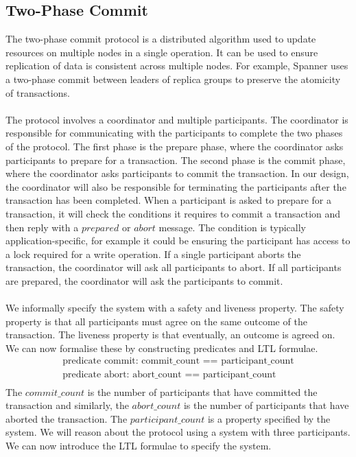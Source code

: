\subsection{Two-Phase Commit} \label{sec:2pc}
The two-phase commit protocol is a distributed algorithm used to update resources on multiple nodes in a single operation. It can be used to ensure replication of data is consistent across multiple nodes. For example, Spanner \cite{spanner} uses a two-phase commit between leaders of replica groups to preserve the atomicity of transactions.
\\ \\
The protocol involves a coordinator and multiple participants. The coordinator is responsible for communicating with the participants to complete the two phases of the protocol. The first phase is the prepare phase, where the coordinator asks participants to prepare for a transaction. The second phase is the commit phase, where the coordinator asks participants to commit the transaction. In our design, the coordinator will also be responsible for terminating the participants after the transaction has been completed. When a participant is asked to prepare for a transaction, it will check the conditions it requires to commit a transaction and then reply with a $prepared$ or $abort$ message. The condition is typically application-specific, for example it could be ensuring the participant has access to a lock required for a write operation. If a single participant aborts the transaction, the coordinator will ask all participants to abort. If all participants are prepared, the coordinator will ask the participants to commit.
\\ \\
We informally specify the system with a safety and liveness property. The safety property is that all participants must agree on the same outcome of the transaction. The liveness property is that eventually, an outcome is agreed on. We can now formalise these by constructing predicates and LTL formulae.
\[
\begin{array}{l}
\text{predicate commit: commit\_count == participant\_count} \\
\text{predicate abort: abort\_count == participant\_count} \\
\end{array}
\]
The $commit\_count$ is the number of participants that have committed the transaction and similarly, the $abort\_count$ is the number of participants that have aborted the transaction. The $participant\_count$ is a property specified by the system. We will reason about the protocol using a system with three participants. We can now introduce the LTL formulae to specify the system.

